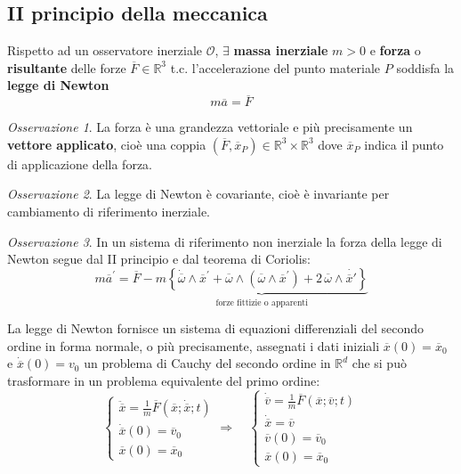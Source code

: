 \documentclass{book}
\theoremstyle{plain}
\theoremstyle{plain}
\theoremstyle{plain}
\theoremstyle{plain}
\theoremstyle{plain}
\theoremstyle{definition}
\theoremstyle{remark}
\newtheorem*{oss}{Osservazione}
\theoremstyle{definition}
\begin{document}
\subsection*{II principio della meccanica}

Rispetto ad un osservatore inerziale $\mathcal{O}$, $\exists$ \textbf{massa inerziale} $m>0$ e \textbf{forza} o \textbf{risultante} delle forze $\overline{F} \in \mathbb{R}^{3}$ t.c. l'accelerazione del punto materiale $P$ soddisfa la \textbf{legge di Newton}
\begin{displaymath}
\boxed{
    m\overline{a}=\overline{F}
    }
\end{displaymath}

\begin{oss}
    La forza è una grandezza vettoriale e più precisamente un \textbf{vettore applicato}, cioè una coppia $\left(\overline{F}, \overline{x}_P\right) \in \mathbb{R}^{3} \times \mathbb{R}^{3}$ dove $\overline{x}_P$ indica il punto di applicazione della forza.
\end{oss}

\begin{oss}
     La legge di Newton è covariante, cioè è invariante per cambiamento di riferimento inerziale.
\end{oss}

\begin{oss}
    In un sistema di riferimento non inerziale la forza della legge di Newton segue dal II principio e dal teorema di Coriolis:
    \begin{displaymath}
        m\overline{a}^{\prime}=\overline{F}-\underbrace{m\left\{\dot{\overline{\omega}} \wedge \overline{x}^{\prime}+\overline{\omega} \wedge\left(\overline{\omega} \wedge \overline{x}^{\prime}\right)+2\,\overline{\omega} \wedge \dot{\overline{x}'}\right\}}_{\text{forze fittizie o apparenti}}
    \end{displaymath}
\end{oss}

\noindent La legge di Newton fornisce un sistema di equazioni differenziali del secondo ordine in forma normale, o più precisamente, assegnati i dati iniziali $\overline{x}(0)=\overline{x}_0$ e $\dot{\overline{x}}(0)=v_0$ un problema di Cauchy del secondo ordine in $\mathbb{R}^d$ che si può trasformare in un problema equivalente del primo ordine:
\begin{displaymath}
    \begin{cases}
    \ddot{\overline{x}}=\frac{1}{m}\overline{F}\left(\overline{x}; \dot{\overline{x}}; t\right) \\
    \dot{\overline{x}}(0)=\overline{v}_0 \\
    \overline{x}(0)=\overline{x}_0
    \end{cases} \Longrightarrow \quad
    \begin{cases}
    \dot{\overline{v}}=\frac{1}{m}\overline{F}\left(\overline{x}; \overline{v}; t\right) \\
    \dot{\overline{x}}=\overline{v} \\
    \overline{v}(0)=\overline{v}_0 \\
    \overline{x}(0)=\overline{x}_0
    \end{cases}
\end{displaymath}
\end{document}
